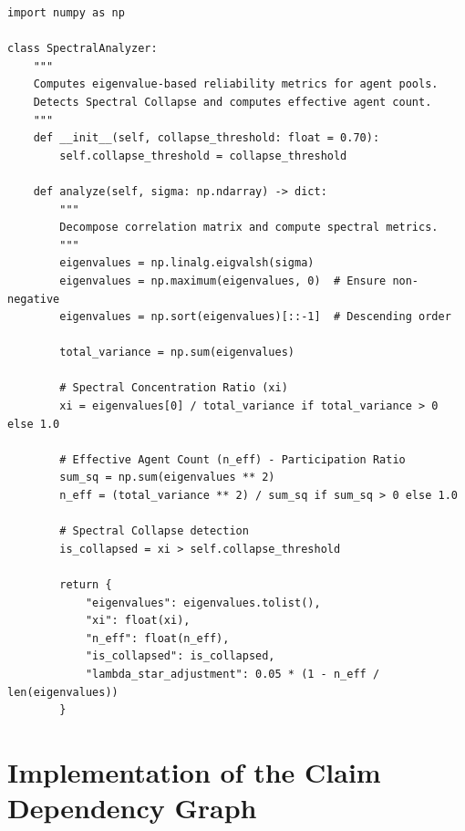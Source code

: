 \documentclass[12pt,a4paper]{report}
\begin{document}
\begin{lstlisting}[caption={Spectral Analysis: Effective Agent Count and Collapse Detection},
                   label={lst:spectral}]
import numpy as np

class SpectralAnalyzer:
    """
    Computes eigenvalue-based reliability metrics for agent pools.
    Detects Spectral Collapse and computes effective agent count.
    """
    def __init__(self, collapse_threshold: float = 0.70):
        self.collapse_threshold = collapse_threshold

    def analyze(self, sigma: np.ndarray) -> dict:
        """
        Decompose correlation matrix and compute spectral metrics.
        """
        eigenvalues = np.linalg.eigvalsh(sigma)
        eigenvalues = np.maximum(eigenvalues, 0)  # Ensure non-negative
        eigenvalues = np.sort(eigenvalues)[::-1]  # Descending order

        total_variance = np.sum(eigenvalues)

        # Spectral Concentration Ratio (xi)
        xi = eigenvalues[0] / total_variance if total_variance > 0 else 1.0

        # Effective Agent Count (n_eff) - Participation Ratio
        sum_sq = np.sum(eigenvalues ** 2)
        n_eff = (total_variance ** 2) / sum_sq if sum_sq > 0 else 1.0

        # Spectral Collapse detection
        is_collapsed = xi > self.collapse_threshold

        return {
            "eigenvalues": eigenvalues.tolist(),
            "xi": float(xi),
            "n_eff": float(n_eff),
            "is_collapsed": is_collapsed,
            "lambda_star_adjustment": 0.05 * (1 - n_eff / len(eigenvalues))
        }
\end{lstlisting}

\section{Implementation of the Claim Dependency Graph}
\end{document}
